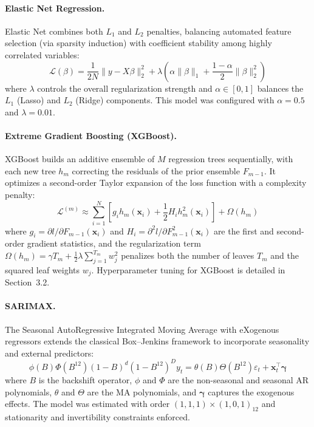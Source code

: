 \documentclass[14pt, a4paper]{extarticle}
\newcommand{\bx}{\mathbf{x}}
\begin{document}
\paragraph{Elastic Net Regression.}
Elastic Net combines both $L_1$ and $L_2$ penalties, balancing automated feature selection (via sparsity induction) with coefficient stability among highly correlated variables:
\begin{equation}
    \mathcal{L}(\beta) = \frac{1}{2N} \| y - X\beta \|_2^2 + \lambda \left( \alpha \|\beta\|_1 + \frac{1-\alpha}{2} \|\beta\|_2^2 \right)
    \label{eq:elasticnet}
\end{equation}
where $\lambda$ controls the overall regularization strength and $\alpha \in [0,1]$ balances the $L_1$ (Lasso) and $L_2$ (Ridge) components. This model was configured with $\alpha = 0.5$ and $\lambda = 0.01$.

\paragraph{Extreme Gradient Boosting (XGBoost).}
XGBoost builds an additive ensemble of $M$ regression trees sequentially, with each new tree $h_m$ correcting the residuals of the prior ensemble $F_{m-1}$. It optimizes a second-order Taylor expansion of the loss function with a complexity penalty:
\begin{equation}
    \mathcal{L}^{(m)} \approx \sum_{i=1}^N \left[ g_i h_m(\bx_i) + \frac{1}{2} H_i h_m^2(\bx_i) \right] + \Omega(h_m)
    \label{eq:xgboost}
\end{equation}
where $g_i = \partial l / \partial F_{m-1}(\bx_i)$ and $H_i = \partial^2 l / \partial F_{m-1}^2(\bx_i)$ are the first and second-order gradient statistics, and the regularization term $\Omega(h_m) = \gamma T_m + \frac{1}{2}\lambda \sum_{j=1}^{T_m} w_j^2$ penalizes both the number of leaves $T_m$ and the squared leaf weights $w_j$. Hyperparameter tuning for XGBoost is detailed in Section~3.2.

\paragraph{SARIMAX.}
The Seasonal AutoRegressive Integrated Moving Average with eXogenous regressors extends the classical Box--Jenkins framework to incorporate seasonality and external predictors:
\begin{equation}
    \phi(B)\Phi(B^{12})(1-B)^d (1-B^{12})^D y_t = \theta(B)\Theta(B^{12})\varepsilon_t + \bx_t^\top \boldsymbol{\gamma}
\end{equation}
where $B$ is the backshift operator, $\phi$ and $\Phi$ are the non-seasonal and seasonal AR polynomials, $\theta$ and $\Theta$ are the MA polynomials, and $\boldsymbol{\gamma}$ captures the exogenous effects. The model was estimated with order $(1,1,1) \times (1,0,1)_{12}$ and stationarity and invertibility constraints enforced.
\end{document}
